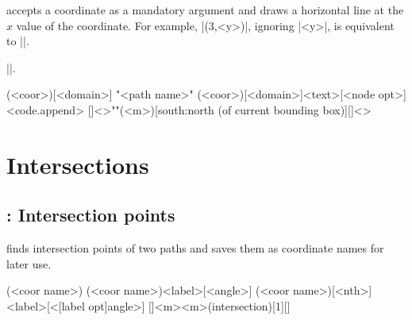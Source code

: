 \subsection{\protect\cmd{\tzvfn}}
\label{ss:tzvfn}

\icmd{\tzvfn} accepts a coordinate as a mandatory argument and draws a horizontal line at the $x$ value of the coordinate.
For example, |\tzvfn(3,<y>)|, ignoring |<y>|, is equivalent to ||.

 |\tzvfnat|.

\begin{tzdef}{}
\tzvfn(<coor>)[<domain>]
"<path name>"
      (<coor>)[<domain>]{<text>}[<node opt>]<code.append>
  []<>""(<m>)[south:north (of current bounding box)]{}[]<>
\end{tzdef}

\begin{tzcode}{.3}
\end{tzcode}





\chapter{Intersections}
\label{c:intersections}

\section{\protect\cmd{\tzXpoint(*)}: Intersection points}
\label{s:intersections}

\icmd{\tzXpoint} finds intersection points of two paths and saves them as coordinate names for later use.

\begin{tzdef}{}
(<coor name>)
(<coor name>){<label>}[<angle>]
(<coor name>)[<nth>]{<label>}[<[label opt]angle>]
  []{<m>}{<m>}(intersection)[1]{}[]
\end{tzdef}


